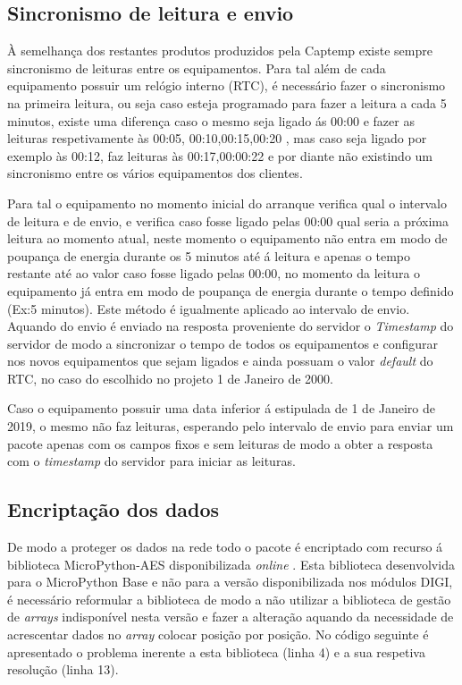 \subsection {Sincronismo de leitura e envio} \label{sinc}

\par À semelhança dos restantes produtos produzidos pela Captemp existe sempre sincronismo de leituras entre os equipamentos. Para tal além de cada equipamento possuir um relógio interno (RTC), é necessário fazer o sincronismo na primeira leitura, ou seja caso esteja programado para fazer a leitura a cada 5 minutos, existe uma diferença caso o mesmo seja ligado ás 00:00 e fazer as leituras respetivamente às 00:05, 00:10,00:15,00:20 , mas caso seja ligado por exemplo às 00:12, faz leituras às 00:17,00:00:22 e por diante não existindo um sincronismo entre os vários equipamentos dos clientes.
\par Para tal o equipamento no momento inicial do arranque verifica qual o intervalo de leitura e de envio, e verifica caso fosse ligado pelas 00:00 qual seria a próxima leitura ao momento atual, neste momento o equipamento não entra em modo de poupança de energia durante os 5 minutos até á leitura e apenas o tempo restante até ao valor caso fosse ligado pelas 00:00, no momento da leitura o equipamento já entra em modo de poupança de energia durante o tempo definido (Ex:5 minutos). Este método é igualmente aplicado ao intervalo de envio. Aquando do envio é enviado na resposta proveniente do servidor o \textit{Timestamp} do servidor de modo a sincronizar o tempo de todos os equipamentos e configurar nos novos equipamentos que sejam ligados e ainda possuam o valor \textit{default} do RTC, no caso do escolhido no projeto 1 de Janeiro de 2000.
\par Caso o equipamento possuir uma data inferior á estipulada de 1 de Janeiro de 2019, o mesmo não faz leituras, esperando pelo intervalo de envio para enviar um pacote apenas com os campos fixos e sem leituras de modo a obter a resposta com o \textit{timestamp} do servidor para iniciar as leituras.


\subsection {Encriptação dos dados}

\par De modo a proteger os dados na rede todo o pacote é encriptado com recurso á biblioteca MicroPython-AES disponibilizada \textit{online} \cite{microaes}. Esta biblioteca desenvolvida para o MicroPython Base e não para a versão disponibilizada nos módulos DIGI, é necessário reformular a biblioteca de modo a não utilizar a biblioteca de gestão de \textit{arrays} indisponível nesta versão e fazer a alteração aquando da necessidade de acrescentar dados no \textit{array} colocar posição por posição. No código seguinte é apresentado o problema inerente a esta biblioteca (linha 4) e a sua respetiva resolução (linha 13).


